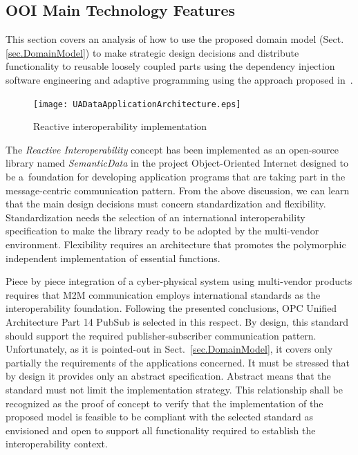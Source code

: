 \documentclass{jacsart}
\begin{document}
\subsection{OOI Main Technology Features}\label{ooi-main-technology-features}

This section covers an analysis of how to use the proposed domain model (Sect. \ref*{sec.DomainModel}) to make strategic design decisions and distribute functionality to reusable loosely coupled parts using the dependency injection software engineering and adaptive programming using the approach proposed in~\cite{RefWorks:doc:5d9796cbe4b0f66c52dccf04}.

\begin{figure}
  \texttt{[image: UADataApplicationArchitecture.eps]} 
  \caption{Reactive interoperability implementation}\label{fig_rii}
\end{figure}

The \emph{Reactive Interoperability} concept has been implemented as an open-source library named \textit{SemanticData} in the project Object-Oriented Internet \cite{RefWorks:doc:5c66740ae4b081adf5804596} designed to be a~foundation for developing application programs that are taking part in the message-centric communication pattern. From the above discussion, we can learn that the main design decisions must concern standardization and flexibility. Standardization needs the selection of an international interoperability specification to make the library ready to be adopted by the multi-vendor environment. Flexibility requires an architecture that promotes the polymorphic independent implementation of essential functions.

Piece by piece integration of a cyber-physical system using multi-vendor products requires that M2M communication employs international standards as the interoperability foundation. Following the presented conclusions, OPC Unified Architecture Part 14 PubSub \cite{RefWorks:doc:5d98837de4b055984c0eecf0} is selected in this respect. By design, this standard should support the required publisher-subscriber communication pattern.  Unfortunately, as it is pointed-out in Sect.~\ref*{sec.DomainModel}, it covers only partially the requirements of the applications concerned. It must be stressed that by design it provides only an abstract specification. Abstract means that the standard must not limit the implementation strategy. This relationship shall be recognized as the proof of concept to verify that the implementation of the proposed model is feasible to be compliant with the selected standard as envisioned and open to support all functionality required to establish the interoperability context.
\end{document}
